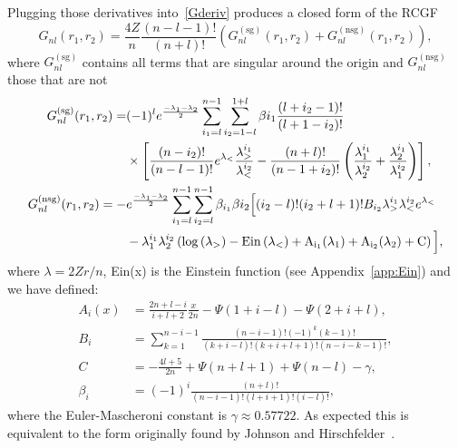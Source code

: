 Plugging those derivatives into~\eqref{Gderiv} produces a closed form of the RCGF
\begin{equation}
  G_{nl}(r_1,r_2) = \frac{4Z}{n} \frac{(n-l-1)!}{(n+l)!}
  \left(G_{nl}^{(\mathrm{sg})}(r_1,r_2) +
  G_{nl}^{(\mathrm{nsg})}(r_1,r_2)\right), \label{eq:68}
\end{equation}
where $G^{(\mathrm{sg})}_{nl}$ contains all terms that are singular
around the origin and $G^{(\mathrm{nsg})}_{nl}$ those that are not
\begin{align}\label{GnSchr}
  G_{nl}^{(\mathrm{sg})}(r_1,r_2)
  = &(-1)^{l}e^{\frac{-\lambda_1-\lambda_2}{2}} \sum_{i_1=l}^{n-1} \sum_{i_2=1-l}^{1+l}
    \beta{i_1}  \frac{(l+i_2-1)!}{(l+1-i_2)!}\nonumber
  \\
  &\times \left[\frac{(n-i_2)!}{(n-l-1)!}e^{\lambda_<}
    \frac{\lambda_>^{i_1}}{\lambda_<^{i_2}} - \frac{(n+l)!}{(n-1+i_2)!}
    \left(\frac{\lambda_1^{i_1}}{\lambda_2^{i_2}} + \frac{\lambda_2^{i_1}}{\lambda_1^{i_2}} \right)
    \right],
  \\
  G_{nl}^{(\mathrm{nsg})}(r_1,r_2)
  = -&e^{\frac{-\lambda_1-\lambda_2}{2}}\sum_{i_1=l}^{n-1} \sum_{i_2=l}^{n-1}
    \beta_{i_1}\beta{i_2}
    \Big[(i_2-l)!(i_2+l+1)!B_{i_2}\lambda_>^{i_1}\lambda_<^{i_2}e^{\lambda_<}
     \nonumber
  \\
  &- \lambda_1^{i_1} \lambda_2^{i_2} \left(\log\left(\lambda_>\right) - \rm{Ein}\left(\lambda_<\right) + A_{i_1}(\lambda_1)+A_{i_2}(\lambda_2)+C \right)\Big],
\end{align}
where $\lambda=2Zr/n$, Ein(x) is the Einstein function (see Appendix~\ref{app:Ein}) and we have defined:
\begin{align}
  A_{i}(x) &= \frac{2n+l-i}{i+l+2}\frac{x}{2n}- \Psi(1+i-l)- \Psi(2+i+l), \label{eq:21}
  \\
  B_{i}&=\sum_{k=1}^{n-i-1}
    \frac{(n-i-1)!(-1)^{k}(k-1)!}
    {(k+i-l)!(k+i+l+1)!(n-i-k-1)!},
    \\
    C&=-\frac{4l+5}{2n} + \Psi(n+l+1) + \Psi(n-l)-\gamma,
    \\
    \beta_i &= (-1)^i\frac{(n+l)!}{(n-i-1)!(l+i+1)!(i-l)!},
\end{align}
where the Euler-Mascheroni constant is $\gamma \approx 0.57722$.
As expected this is equivalent to the form originally found by Johnson and Hirschfelder~\cite{JandH}.

